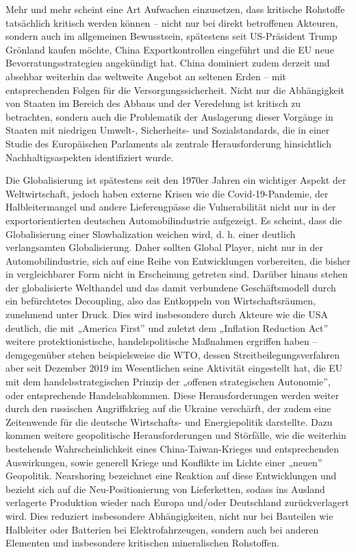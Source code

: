 \documentclass[12pt,a4paper,oneside]{book} %
\begin{document}
	Mehr und mehr scheint eine Art Aufwachen einzusetzen, dass kritische Rohstoffe tatsächlich kritisch werden können -- nicht nur bei direkt betroffenen Akteuren, sondern auch im allgemeinen Bewusstsein, spätestens seit US-Präsident Trump Grönland kaufen möchte, China Exportkontrollen eingeführt und die EU neue Bevorratungsstrategien angekündigt hat. China dominiert zudem derzeit und absehbar weiterhin das weltweite Angebot an seltenen Erden -- mit entsprechenden Folgen für die Versorgungssicherheit. Nicht nur die Abhängigkeit von Staaten im Bereich des Abbaus und der Veredelung ist kritisch zu betrachten, sondern auch die Problematik der Auslagerung dieser Vorgänge in Staaten mit niedrigen Umwelt-, Sicherheits- und Sozialstandards,\autocite[siehe hierzu]{ÖAW Artikel} die in einer Studie des Europäischen Parlaments als zentrale Herausforderung hinsichtlich Nachhaltigsaspekten identifiziert wurde.\autocite[16]{The role of research and innovation in ensuring a safe and sustainable supply of critical raw materials in the EU}
	
	Die Globalisierung ist spätestens seit den 1970er Jahren ein wichtiger Aspekt der Weltwirtschaft, jedoch haben externe Krisen wie die Covid-19-Pandemie, der Halbleitermangel und andere Lieferengpässe die Vulnerabilität nicht nur in der exportorientierten deutschen Automobilindustrie aufgezeigt. Es scheint, dass die Globalisierung einer Slowbalization weichen wird, d. h. einer deutlich verlangsamten Globalisierung. Daher sollten Global Player, nicht nur in der Automobilindustrie, sich auf eine Reihe von Entwicklungen vorbereiten, die bisher in vergleichbarer Form nicht in Erscheinung getreten sind.
	Darüber hinaus stehen der globalisierte Welthandel und das damit verbundene Geschäftsmodell durch ein befürchtetes Decoupling, also das Entkoppeln von Wirtschaftsräumen, zunehmend unter Druck. Dies wird insbesondere durch Akteure wie die USA deutlich, die mit „America First” und zuletzt dem „Inflation Reduction Act” weitere protektionistische, handelspolitische Maßnahmen ergriffen haben – demgegenüber stehen beispielsweise die WTO, dessen Streitbeilegungsverfahren aber seit Dezember 2019 im Wesentlichen seine Aktivität eingestellt hat, die EU mit dem handelsstrategischen Prinzip der „offenen strategischen Autonomie”, oder entsprechende Handelsabkommen. Diese Herausforderungen werden weiter durch den russischen Angriffskrieg auf die Ukraine verschärft, der zudem eine Zeitenwende für die deutsche Wirtschafts- und Energiepolitik darstellte. Dazu kommen weitere geopolitische Herausforderungen und Störfälle, wie die weiterhin bestehende Wahrscheinlichkeit eines China-Taiwan-Krieges und entsprechenden Auswirkungen, sowie generell Kriege und Konflikte im Lichte einer „neuen” Geopolitik. Nearshoring bezeichnet eine Reaktion auf diese Entwicklungen und bezieht sich auf die Neu-Positionierung von Lieferketten, sodass ins Ausland verlagerte Produktion wieder nach Europa und/oder Deutschland zurückverlagert wird. Dies reduziert insbesondere Abhängigkeiten, nicht nur bei Bauteilen wie Halbleiter oder Batterien bei Elektrofahrzeugen, sondern auch bei anderen Elementen und insbesondere kritischen mineralischen Rohstoffen.
	
\end{document}
